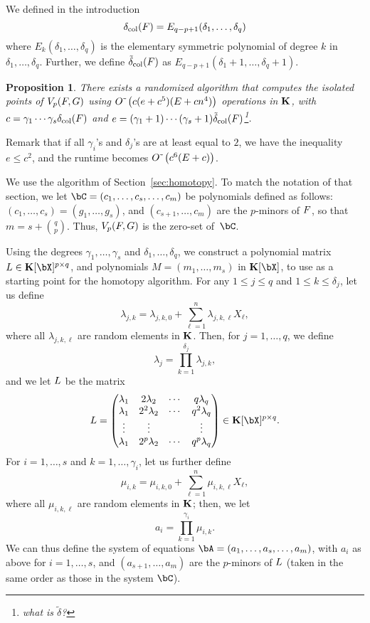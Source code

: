 \documentclass[12pt]{article}
\newtheorem{proposition}[definition]{Proposition}
\begin{document}
We defined in the introduction 
$$\delta_{\rm col}({F}) = E_{q-p+1}(\delta_1, \ldots, \delta_q)$$
where $E_k(\delta_1,\dots,\delta_q)$ is the elementary symmetric
polynomial of degree $k$ in $\delta_1, \ldots, \delta_q$. Further, we
define $\tilde\delta_{\rm col}({F})$ as
$E_{q-p+1}(\delta_1+1, \ldots, \delta_q+1)$.
\begin{proposition}
  There exists a randomized algorithm that computes the isolated
  points of $V_{p}({F},G)$ using
  ${O}{\,\tilde{ }\,}\left (c(e+c^5 )(E + cn^4)\right)$ operations in $\mathbf{K}$, with
  $c=\gamma_1\cdots\gamma_s \delta_{\rm col}({F})$ and
  $e=(\gamma_1+1)\cdots(\gamma_s+1) \tilde\delta_{\rm
    col}({F})$\footnote{what is $\tilde\delta$?}.
\end{proposition}
Remark that if all $\gamma_i$'s and $\delta_j$'s are at least equal to
$2$, we have the inequality $e \le c^2$, and the runtime becomes
${O}{\,\tilde{ }\,}\left (c^6 (E + c)\right)$.

\medskip

We use the algorithm of Section~\ref{sec:homotopy}. To match the
notation of that section, we let $\bC=(c_1,\dots,c_{s},\dots,c_m)$ be
polynomials defined as follows: $(c_1,\dots,c_{s})=(g_1,\dots,g_s)$,
and $(c_{s+1},\dots,c_{m})$ are the $p$-minors of ${F}$, so that 
$m=s+{q \choose p}$. Thus, $V_{p}({F},G)$ is the zero-set of~$\bC$.

Using the degrees $\gamma_1,\dots,\gamma_s$ and  $\delta_1,\dots,\delta_q$, we construct a polynomial matrix $\mL \in
\KK[\bX]^{p \times q}$, and polynomials $M=(m_1,\dots,m_s)$ in
$\KK[\bX]$, to use as a starting point for the homotopy
algorithm. For any $1 \leq j \leq q$ and $1 \leq k \leq \delta_j$, let us
define $$\lambda_{j,k} = \lambda_{j,k,0} + \sum_{\ell = 1}^{n}\lambda_{j,k,\ell}X_\ell,$$ 
where all $\lambda_{j,k,\ell}$ are random elements in
$\mathbf{K}$. Then, for $j=1,\dots,q$, we define
$$\lambda_j = \prod_{k=1}^{\delta_j}\lambda_{j,k},$$
and we let  ${L}$ be the matrix
\begin{align}\label{eqdef:col}
\mL = 
\left( \begin{matrix}
\lambda_1 & 2\lambda_2 & \cdots & q\lambda_{q}\\
\lambda_1 & 2^2\lambda_2 & \cdots & q^2\lambda_q\\
\vdots & \vdots &  & \vdots \\
\lambda_1 & 2^p\lambda_2 & \cdots & q^p\lambda_q
\end{matrix} \right) \in \KK[\bX]^{p\times q}.
\end{align}
For $i=1,\dots,s$ and $k=1,\dots,\gamma_i$, let us further define
$$\mu_{i,k} =  \mu_{i,k,0} + \sum_{\ell = 1}^{n}\mu_{i,k,\ell}X_\ell,$$ where
all $\mu_{i,k,\ell}$ are random elements in $\mathbf{K}$; then, we let
$$a_i=\prod_{k=1}^{\gamma_i} \mu_{i,k}.$$ We can thus define the
system of equations $\bA=(a_1,\dots,a_s,\dots,a_m)$, with $a_i$ as
above for $i=1,\dots,s$, and $(a_{s+1},\dots,a_{m})$ are the
$p$-minors of ${L}$ (taken in the same order as those in the system
$\bC$).
\end{document}

